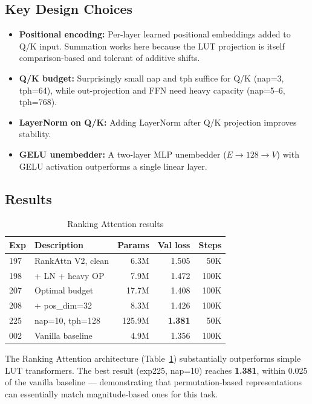 \documentclass[11pt]{article}
\begin{document}
\subsection{Key Design Choices}

\begin{itemize}
    \item \textbf{Positional encoding:} Per-layer learned positional embeddings added to Q/K input. Summation works here because the LUT projection is itself comparison-based and tolerant of additive shifts.
    \item \textbf{Q/K budget:} Surprisingly small nap and tph suffice for Q/K (nap=3, tph=64), while out-projection and FFN need heavy capacity (nap=5--6, tph=768).
    \item \textbf{LayerNorm on Q/K:} Adding LayerNorm after Q/K projection improves stability.
    \item \textbf{GELU unembedder:} A two-layer MLP unembedder ($E \to 128 \to V$) with GELU activation outperforms a single linear layer.
\end{itemize}

\subsection{Results}

\begin{table}[!t]
\caption{Ranking Attention results}
\label{tab:rank_attn}
\centering
\begin{tabular}{llrrr}
\toprule
Exp & Description & Params & Val loss & Steps \\
\midrule
197 & RankAttn V2, clean & 6.3M & 1.505 & 50K \\
198 & + LN + heavy OP & 7.9M & 1.472 & 100K \\
207 & Optimal budget & 17.7M & 1.408 & 100K \\
208 & + pos\_dim=32 & 8.3M & 1.426 & 100K \\
225 & nap=10, tph=128 & 125.9M & \textbf{1.381} & 50K \\
\midrule
002 & Vanilla baseline & 4.9M & 1.356 & 100K \\
\bottomrule
\end{tabular}
\end{table}

The Ranking Attention architecture (Table~\ref{tab:rank_attn}) substantially outperforms simple LUT transformers.
The best result (exp225, nap=10) reaches \textbf{1.381}, within 0.025 of the vanilla baseline --- demonstrating that permutation-based representations can essentially match magnitude-based ones for this task.
\end{document}

